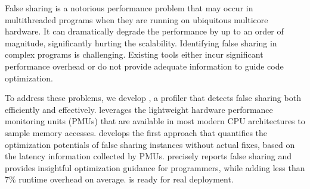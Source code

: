
False sharing is a notorious performance problem that may occur in multithreaded programs when they are running on ubiquitous multicore hardware. It can dramatically degrade the performance by up to an order of magnitude, significantly hurting the scalability. Identifying false sharing in complex programs is challenging. Existing tools either incur significant performance overhead or do not provide adequate information to guide code optimization.

\sloppy
To address these problems, we develop \cheetah{}, a profiler that detects false sharing both efficiently and effectively. \cheetah{} leverages the lightweight hardware performance monitoring units (PMUs) that are available in most modern CPU architectures to sample memory accesses. \cheetah{} develops the first approach that quantifies the optimization potentials of false sharing instances without actual fixes, based on the latency information collected by PMUs. \cheetah{} precisely reports false sharing and provides insightful optimization guidance for programmers, while adding less than $7\%$ runtime overhead on average. \Cheetah{} is ready for real deployment. 

